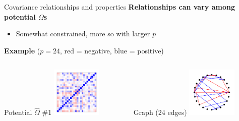 \documentclass[professionalfonts]{beamer}
\begin{document}
\begin{frame}{Covariance relationships and properties}
\textbf{Relationships can vary among potential $\Omega$s}
\begin{itemize}
\item Somewhat constrained, more so with larger $p$
\end{itemize}
\textbf{Example} ($p = 24$, {\color{red} red} = negative, {\color{blue} blue} = positive)
\begin{columns}
\begin{column}{0.45\textwidth}
\begin{center}
Potential $\widehat{\Omega}$ \#1
\includegraphics[width=90px]{figs/example-alt1-cor.pdf}
\end{center}
\end{column}
\begin{column}{0.45\textwidth}
\begin{center}
Graph (24 edges)
\includegraphics[width=90px]{figs/example-alt1-graph.pdf}
\end{center}
\end{column}
\end{columns}
\end{frame}
\end{document}
